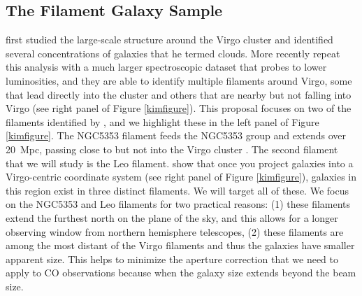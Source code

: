 \documentclass[12pt, preprint]{aastex}
\newcommand{\ha}{$H\alpha$}
\begin{document}
 

\vspace*{-1cm}\subsection{The Filament Galaxy Sample} 
\vspace*{-.4cm}
\citet{tully82} first studied the large-scale structure around the Virgo
cluster and identified several concentrations of galaxies that he
termed clouds.  More recently \citet{kim16} repeat this analysis with
a much larger spectroscopic dataset that probes to lower luminosities,
and they are able to identify multiple
filaments around Virgo, some that lead directly into the cluster and
others that are nearby but not falling into Virgo (see right panel of Figure \ref{kimfigure}).
This proposal focuses on two of the filaments identified by
\citet{kim16}, and we highlight these in the left panel of Figure
\ref{kimfigure}.  The NGC5353 filament feeds the NGC5353 group and extends over 20~Mpc,
passing close to but not into the Virgo cluster \citep{kim16}.  The second filament
that we will study is the Leo filament.  \citet{kim16} show that once
you project galaxies into a Virgo-centric coordinate system (see right
panel of Figure \ref{kimfigure}), galaxies
in this region exist in three distinct filaments.  We will target all
of these.  We focus on
the NGC5353 and Leo filaments for two practical reasons:  (1) these filaments
extend the furthest north on the plane of the sky, and this allows
for a longer observing window from northern hemisphere telescopes, (2)
these filaments are among the most distant of the Virgo filaments and
thus the galaxies have smaller apparent size.  This helps to minimize
the aperture correction that we need to apply to CO observations
because when the galaxy size extends beyond the beam size.  
\end{document}
